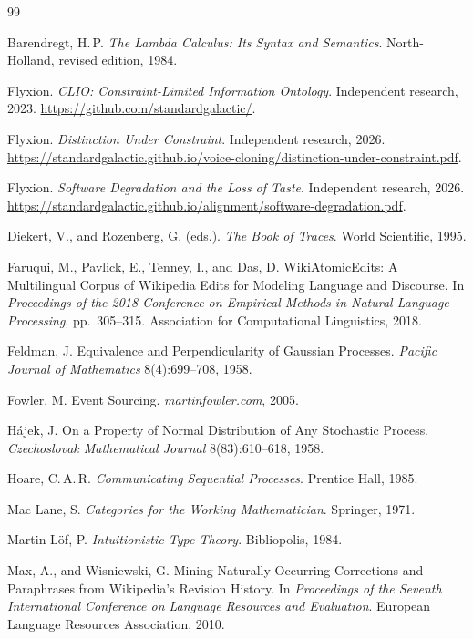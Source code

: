 \documentclass[12pt,oneside,openany]{book}
\theoremstyle{spherepop}
\theoremstyle{remarkstyle}
\begin{document}
\begin{thebibliography}{99}

 Barendregt, H.\,P. \emph{The Lambda Calculus: Its Syntax and Semantics}. North-Holland, revised edition, 1984.

 Flyxion. \emph{CLIO: Constraint-Limited Information Ontology}. Independent research, 2023. \url{https://github.com/standardgalactic/}.

 Flyxion. \emph{Distinction Under Constraint}. Independent research, 2026. \url{https://standardgalactic.github.io/voice-cloning/distinction-under-constraint.pdf}.

 Flyxion. \emph{Software Degradation and the Loss of Taste}. Independent research, 2026. \url{https://standardgalactic.github.io/alignment/software-degradation.pdf}.

 Diekert, V., and Rozenberg, G. (eds.). \emph{The Book of Traces}. World Scientific, 1995.

 Faruqui, M., Pavlick, E., Tenney, I., and Das, D. WikiAtomicEdits: A Multilingual Corpus of Wikipedia Edits for Modeling Language and Discourse. In \emph{Proceedings of the 2018 Conference on Empirical Methods in Natural Language Processing}, pp.\ 305--315. Association for Computational Linguistics, 2018.

 Feldman, J. Equivalence and Perpendicularity of Gaussian Processes. \emph{Pacific Journal of Mathematics} 8(4):699--708, 1958.

 Fowler, M. Event Sourcing. \emph{martinfowler.com}, 2005.

 H\'ajek, J. On a Property of Normal Distribution of Any Stochastic Process. \emph{Czechoslovak Mathematical Journal} 8(83):610--618, 1958.

 Hoare, C.\,A.\,R. \emph{Communicating Sequential Processes}. Prentice Hall, 1985.

 Mac Lane, S. \emph{Categories for the Working Mathematician}. Springer, 1971.

 Martin-L\"of, P. \emph{Intuitionistic Type Theory}. Bibliopolis, 1984.

 Max, A., and Wisniewski, G. Mining Naturally-Occurring Corrections and Paraphrases from Wikipedia's Revision History. In \emph{Proceedings of the Seventh International Conference on Language Resources and Evaluation}. European Language Resources Association, 2010.


\end{thebibliography}
\end{document}
